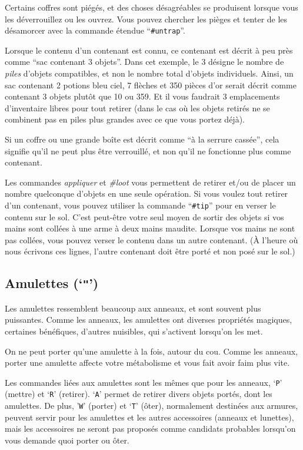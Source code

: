 \documentclass[titlepage]{article}
\begin{document}
Certains coffres sont piégés, et des choses désagréables se produisent lorsque
vous les déverrouillez ou les ouvrez.  Vous pouvez chercher les pièges et tenter de les désamorcer
avec la commande étendue ``\texttt{\#untrap}''.

Lorsque le contenu d'un contenant est connu, ce contenant est
décrit à peu près comme ``sac contenant 3 objets''.
Dans cet exemple, le 3 désigne le nombre de \textit{piles} d'objets
compatibles, et non le nombre total d'objets individuels.
Ainsi, un sac contenant 2 potions bleu ciel, 7 flèches et 350 pièces d'or serait
décrit comme contenant 3 objets plutôt que 10 ou 359.
Et il vous faudrait 3 emplacements d'inventaire libres pour
tout retirer (dans le cas où les objets retirés ne se
combinent pas en piles plus grandes avec ce que vous portez déjà).

Si un coffre ou une grande boîte est décrit comme ``à la serrure cassée'', cela
signifie qu'il ne peut plus être verrouillé, et non qu'il ne fonctionne plus comme contenant.

Les commandes \textit{appliquer} et \textit{\#loot} vous permettent de retirer et/ou
de placer un nombre quelconque d'objets en une seule opération.
Si vous voulez tout retirer d'un contenant, vous pouvez utiliser la
commande ``\texttt{\#tip}'' pour en verser le contenu sur le sol.
C'est peut-être votre seul moyen de sortir des objets si vos mains sont collées
à une arme à deux mains maudite.
Lorsque vos mains ne sont pas collées, vous pouvez verser le
contenu dans un autre contenant.
(À l'heure où nous écrivons ces lignes, l'autre contenant doit être porté et non
posé sur le sol.)

\subsection*{Amulettes (`\texttt{"}')}

Les amulettes ressemblent beaucoup aux anneaux, et sont souvent plus puissantes.
Comme les anneaux, les amulettes ont diverses propriétés magiques, certaines bénéfiques,
d'autres nuisibles, qui s'activent lorsqu'on les met.

On ne peut porter qu'une amulette à la fois, autour du cou.
Comme les anneaux, porter une amulette affecte votre métabolisme et vous
fait avoir faim plus vite.

Les commandes liées aux amulettes sont les mêmes que pour les anneaux, `\texttt{P}' (mettre)
et `\texttt{R}' (retirer).
`\texttt{A}' permet de retirer divers objets portés, dont les amulettes.
De plus, '\texttt{W}' (porter) et `\texttt{T}' (ôter), normalement destinées aux
armures, peuvent servir pour les amulettes et les autres accessoires (anneaux et
lunettes), mais les accessoires ne seront pas proposés comme candidats probables
lorsqu'on vous demande quoi porter ou ôter.
\end{document}
